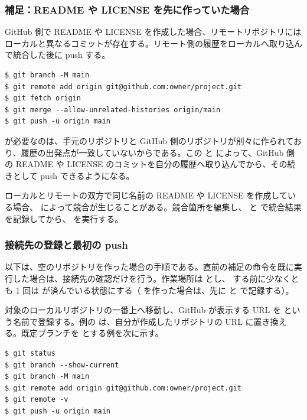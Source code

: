 \subsubsection{補足：README や LICENSE を先に作っていた場合}

GitHub 側で README や LICENSE を作成した場合、リモートリポジトリにはローカルと異なるコミットが存在する。リモート側の履歴をローカルへ取り込んで統合した後に push する。

\begin{lstlisting}[numbers=none, xleftmargin=2\zw]
$ git branch -M main
$ git remote add origin git@github.com:owner/project.git
$ git fetch origin
$ git merge --allow-unrelated-histories origin/main
$ git push -u origin main
\end{lstlisting}

 が必要なのは、手元のリポジトリと GitHub 側のリポジトリが別々に作られており、履歴の出発点が一致していないからである。この  と  によって、GitHub 側の README や LICENSE のコミットを自分の履歴へ取り込んでから、その続きとして push できるようになる。

ローカルとリモートの双方で同じ名前の README や LICENSE を作成している場合、 によって競合が生じることがある。競合箇所を編集し、 と  で統合結果を記録してから、 を実行する。

\subsubsection{接続先の登録と最初の push}

以下は、空のリポジトリを作った場合の手順である。直前の補足の命令を既に実行した場合は、接続先の確認だけを行う。作業場所は  とし、 する前に少なくとも 1 回は  が済んでいる状態にする（ を作った場合は、先に  と  で記録する）。

対象のローカルリポジトリの一番上へ移動し、GitHub が表示する URL を  という名前で登録する。例の  は、自分が作成したリポジトリの URL に置き換える。既定ブランチを  とする例を次に示す。

\begin{lstlisting}[numbers=none, xleftmargin=2\zw]
$ git status
$ git branch --show-current
$ git branch -M main
$ git remote add origin git@github.com:owner/project.git
$ git remote -v
$ git push -u origin main
\end{lstlisting}


